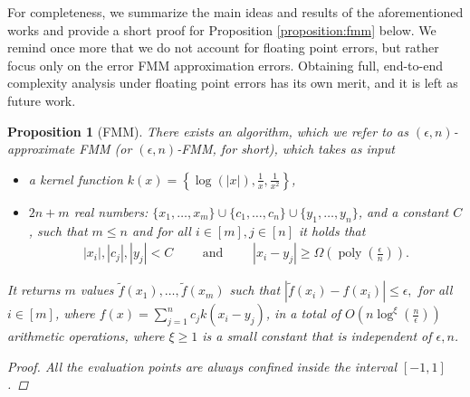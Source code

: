 \documentclass{article}
\newcommand{\labs}{\left|}
\newcommand{\rabs}{\right|}
\newcommand{\lcurly}{\left\{}
\newcommand{\rcurly}{\right\}}
\newcommand{\lpar}{\left(}
\newcommand{\rpar}{\right)}
\newtheorem{proposition}{Proposition}[section]
\DeclareMathOperator{\poly}{poly}
\newcommand{\cfmm}{\xi}
\newcommand{\fmmalgo}{FMM} \usepackage[utf8]{inputenc}
\begin{document}
For completeness, we summarize the main ideas and results of the aforementioned works and provide a short proof for Proposition \ref{proposition:fmm} below.
We remind once more that we do not account for floating point errors, but rather focus only on the error FMM approximation errors. Obtaining full, end-to-end complexity analysis under floating point errors has its own merit, and it is left as future work.
\begin{proposition}[FMM]
    \label{proposition:fmm_appendix}
    There exists an algorithm, which we refer to as $(\epsilon,n)$-approximate FMM (or $(\epsilon,n)$-\fmmalgo, for short), which takes as input 
    \begin{itemize}
        \item a kernel function $k(x)=\lcurly \log(|x|), \frac{1}{x}, \frac{1}{x^2} \rcurly$,
        \item $2n+m$ real numbers: $\{x_1,\ldots,x_m\}\cup \{c_1,\ldots,c_n\}\cup\{y_1,\ldots,y_n\}$, and a constant $C$, such that $m\leq n$ and for all $i\in[m],j\in[n]$ it holds that
        \begin{align*}
            |x_i|,|c_j|,|y_j|<C
            \qquad
            \text{ and }
            \qquad
            |x_i-y_j|\geq \Omega(\poly(\tfrac{\epsilon}{n})).
        \end{align*}
    \end{itemize}
    It returns $m$ values $\widetilde f(x_1),\ldots,\widetilde f(x_m)$ such that
    $
        \labs
            \widetilde f(x_i)-f(x_i)
        \rabs
        \leq \epsilon,
    $
    for all $i\in[m]$, where $f(x) = \sum_{j=1}^n c_j k(x_i-y_j)$,
    in a total of $O\lpar 
        n\log^{\cfmm}(\tfrac{n}{\epsilon})
    \rpar$ arithmetic operations, where $\cfmm\geq 1$ is a small constant that is independent of $\epsilon,n$.
\begin{proof}
    All the evaluation points are always confined inside the interval $[-1,1]$.


\end{proof}
\end{proposition}
\end{document}
